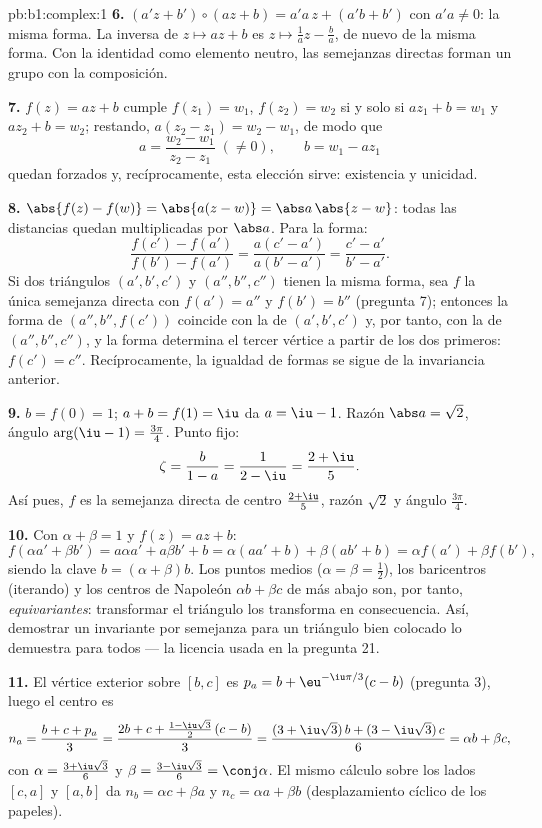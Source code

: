 \begin{solution}{pb:b1:complex:1}
\textbf{6.} $(a'z + b') \circ (az + b) = a'a\,z + (a'b + b')$ con
$a'a \neq 0$: la misma forma. La inversa de $z \mapsto az + b$ es
$z \mapsto \frac1a z - \frac ba$, de nuevo de la misma forma. Con la
 identidad como elemento neutro, las semejanzas directas
forman un grupo con la composición.

\textbf{7.} $f(z) = az + b$ cumple $f(z_1) = w_1$, $f(z_2) = w_2$ si y
solo si $a z_1 + b = w_1$ y $a z_2 + b = w_2$; restando,
$a(z_2 - z_1) = w_2 - w_1$, de modo que
\[
a = \frac{w_2 - w_1}{z_2 - z_1} \;(\neq 0), \qquad
b = w_1 - a z_1
\]
quedan forzados y, recíprocamente, esta elección sirve: existencia y
unicidad.

\textbf{8.} $\abs{f(z) - f(w)} = \abs{a(z - w)} = \abs a\,\abs{z - w}$:
todas las distancias quedan multiplicadas por $\abs a$. Para la forma:
\[
\frac{f(c') - f(a')}{f(b') - f(a')} = \frac{a(c' -
a')}{a(b' - a')} = \frac{c' - a'}{b' - a'} .
\]
Si dos triángulos $(a', b', c')$ y $(a'', b'', c'')$ tienen la misma
forma, sea $f$ la única semejanza directa con $f(a') = a''$ y
$f(b') = b''$ (pregunta 7); entonces la forma de $(a'', b'', f(c'))$
coincide con la de $(a', b', c')$ y, por tanto, con la de
$(a'', b'', c'')$, y la forma determina el tercer vértice a partir de
los dos primeros: $f(c') = c''$. Recíprocamente, la igualdad de formas
se sigue de la invariancia anterior.

\textbf{9.} $b = f(0) = 1$; $a + b = f(1) = \iu$ da $a = \iu - 1$.
Razón $\abs a = \sqrt2$, ángulo $\arg(\iu - 1) = \frac{3\pi}4$. Punto
fijo:
\[
\zeta = \frac{b}{1 - a} = \frac1{2 - \iu} = \frac{2 + \iu}5 .
\]
Así pues, $f$ es la semejanza directa de centro $\frac{2+\iu}5$, razón
$\sqrt2$ y ángulo $\frac{3\pi}4$.

\textbf{10.} Con $\alpha + \beta = 1$ y $f(z) = az + b$:
\[
f(\alpha a' + \beta b') = a\alpha a' + a\beta b' + b
= \alpha(a a' + b) + \beta(a b' + b)
= \alpha f(a') + \beta f(b') ,
\]
siendo la clave $b = (\alpha + \beta)b$. Los puntos medios
($\alpha = \beta = \frac12$), los baricentros (iterando) y los centros
de Napoleón $\alpha b + \beta c$ de más abajo son, por tanto,
\emph{equivariantes}: transformar el triángulo los transforma en
consecuencia. Así, demostrar un  invariante por semejanza para
un triángulo bien colocado lo demuestra para todos --- la licencia
usada en la pregunta 21.

\textbf{11.} El vértice exterior sobre $[b, c]$ es
$p_a = b + \eu^{-\iu\pi/3}(c - b)$ (pregunta 3), luego el centro es
\[
n_a = \frac{b + c + p_a}3
= \frac{2b + c + \frac{1 - \iu\sqrt3}2\,(c - b)}3
= \frac{(3 + \iu\sqrt3)\,b + (3 - \iu\sqrt3)\,c}6
= \alpha b + \beta c ,
\]
con $\alpha = \frac{3 + \iu\sqrt3}6$ y $\beta = \frac{3 -
\iu\sqrt3}6 = \conj\alpha$. El mismo cálculo sobre los lados $[c, a]$ y
$[a, b]$ da $n_b = \alpha c + \beta a$ y $n_c = \alpha a + \beta b$
(desplazamiento cíclico de los papeles).


\end{solution}

